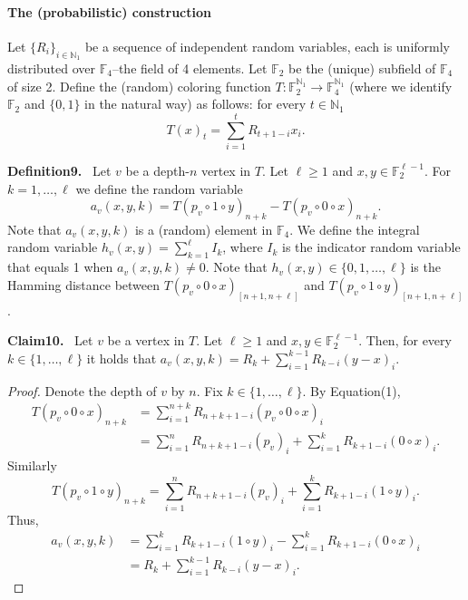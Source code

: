 \documentclass[10pt,a4paper]{article}
\newenvironment{authorclaim}[1]{\par\medskip\noindent\textbf{#1.}\ \ignorespaces}{\par\medskip}
\begin{document}
\paragraph{The (probabilistic) construction}
Let $\{R_i\}_{i\in\mathbb N_1}$ be a sequence of independent random variables, each is uniformly distributed over $\mathbb F_4$--the field of 4 elements. Let $\mathbb F_2$ be the (unique) subfield of $\mathbb F_4$ of size 2. Define the (random) coloring function $T:\mathbb F_2^{\mathbb N_1}\to\mathbb F_4^{\mathbb N_1}$ (where we identify $\mathbb F_2$ and $\{0,1\}$ in the natural way) as follows: for every $t\in\mathbb N_1$
\begin{equation}
T(x)_t=\sum_{i=1}^tR_{t+1-i}x_i.\tag{1}
\end{equation}
\begin{authorclaim}{Definition9}
Let $v$ be a depth-$n$ vertex in $T$. Let $\ell\ge1$ and $x,y\in\mathbb F_2^{\ell-1}$. For $k=1,\ldots,\ell$ we define the random variable
\[
a_v(x,y,k)=T(p_v\circ1\circ y)_{n+k}-T(p_v\circ0\circ x)_{n+k}.
\]
Note that $a_v(x,y,k)$ is a (random) element in $\mathbb F_4$. We define the integral random variable $h_v(x,y)=\sum_{k=1}^\ell I_k$, where $I_k$ is the indicator random variable that equals 1 when $a_v(x,y,k)\ne0$. Note that $h_v(x,y)\in\{0,1,\ldots,\ell\}$ is the Hamming distance between $T(p_v\circ0\circ x)_{[n+1,n+\ell]}$ and $T(p_v\circ1\circ y)_{[n+1,n+\ell]}$.
\end{authorclaim}
\begin{authorclaim}{Claim10}
Let $v$ be a vertex in $T$. Let $\ell\ge1$ and $x,y\in\mathbb F_2^{\ell-1}$. Then, for every $k\in\{1,\ldots,\ell\}$ it holds that $a_v(x,y,k)=R_k+\sum_{i=1}^{k-1}R_{k-i}(y-x)_i$.
\end{authorclaim}
\begin{proof}
Denote the depth of $v$ by $n$. Fix $k\in\{1,\ldots,\ell\}$. By Equation(1),
\begin{align*}
T(p_v\circ0\circ x)_{n+k}
&=\sum_{i=1}^{n+k}R_{n+k+1-i}(p_v\circ0\circ x)_i\\
&=\sum_{i=1}^nR_{n+k+1-i}(p_v)_i+\sum_{i=1}^kR_{k+1-i}(0\circ x)_i.
\end{align*}
Similarly
\[
T(p_v\circ1\circ y)_{n+k}
=\sum_{i=1}^nR_{n+k+1-i}(p_v)_i+\sum_{i=1}^kR_{k+1-i}(1\circ y)_i.
\]
Thus,
\begin{align*}
a_v(x,y,k)
&=\sum_{i=1}^kR_{k+1-i}(1\circ y)_i-\sum_{i=1}^kR_{k+1-i}(0\circ x)_i\\
&=R_k+\sum_{i=1}^{k-1}R_{k-i}(y-x)_i.
\end{align*}
\end{proof}
\end{document}
